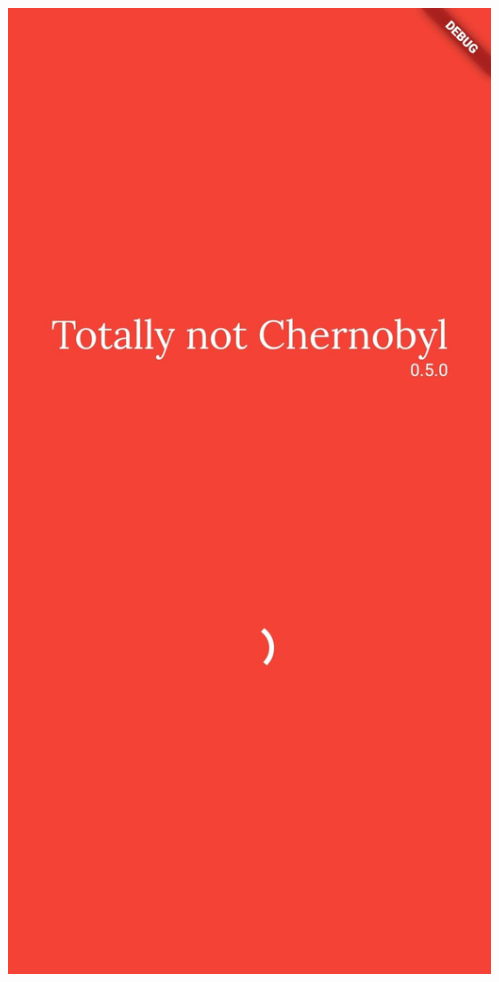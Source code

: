 \documentclass[czech,aspectratio=169]{beamer}
\begin{document}
  \begin{frame}
    \begin{columns}
      \begin{column}{.25\textwidth}
        \begin{center}
          \includegraphics[width=.9\textwidth]{assets/slides/screen-0}
        \end{center}
      \end{column}
      \begin{column}{.25\textwidth}

\end{column}
\end{columns}
\end{frame}
\end{document}
